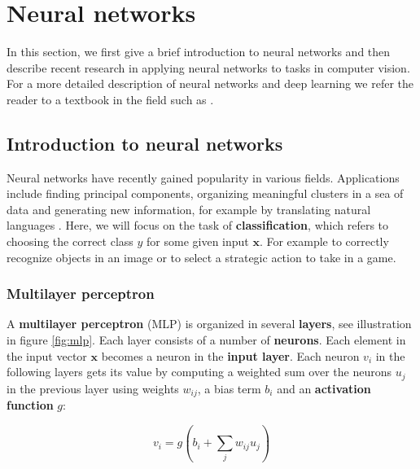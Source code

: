

\section{Neural networks}
\label{sec:networks}
In this section, we first give a brief introduction to neural networks and then describe recent research in applying neural networks to tasks in computer vision.
For a more detailed description of neural networks and deep learning we refer the reader to a textbook in the field such as \cite{GoodfellowBook}.

\subsection{Introduction to neural networks}

Neural networks have recently gained popularity in various fields.
Applications include finding principal components, organizing meaningful clusters in a sea of data and generating new information, for example by translating natural languages \cite{machine_translation_attention}. Here, we will focus on the task of \textbf{classification}, which refers to choosing the correct class $y$ for some given input $\mathbf{x}$. For example to correctly recognize objects in an image or to select a strategic action to take in a game.

\subsubsection{Multilayer perceptron}



A \textbf{multilayer perceptron} (MLP) is organized in several \textbf{layers}, see illustration in figure \ref{fig:mlp}. Each layer consists of a number of \textbf{neurons}.
Each element in the input vector $\mathbf{x}$ becomes a neuron in the \textbf{input layer}. Each neuron $v_i$ in the following layers gets its value by computing a weighted sum over the neurons $u_j$ in the previous layer using weights  $w_{ij}$, a bias term $b_i$ and an \textbf{activation function} $g$:

\[
v_i = g\left( b_i + \sum_j w_{ij} u_j \right)
\]

